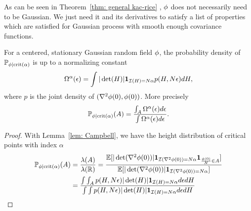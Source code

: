 \begin{remark}
	As can be seen in Theorem~\ref{thm: general kac-rice} \parencite[Theorem
	11.2.1]{adlerRandomFieldsGeometry2007}, \(\phi\) does not necessarily
	need to be Gaussian. We just need it and its derivatives to satisfy a
	list of properties which are satisfied for Gaussian process with
	smooth enough covariance functions.
\end{remark}

\begin{corollary}
	For a centered, stationary Gaussian random field \(\phi\), the probability
	density of \(\mathbb{P}_{\phi\mid\text{crit}(\alpha)}\) is up to a normalizing
	constant
	\begin{equation*}
		\Omega^\alpha(\epsilon)
		= \int |\det(H)| \mathbf{1}_{\mathcal{I}(H) = N\alpha} p(H, N\epsilon)dH,
	\end{equation*}
	where \(p\) is the joint density of \((\nabla^2 \phi(0), \phi(0))\).
	More precisely
	\[
		\mathbb{P}_{\phi\mid\text{crit}(\alpha)}(A)
		= \frac{\int_A \Omega^\alpha(\epsilon)d\epsilon}{\int \Omega^\alpha(\epsilon)d\epsilon}.
	\]
\end{corollary}
\begin{proof}
	With Lemma~\ref{lem: Campbell}, we have the height distribution of critical
	points with index \(\alpha\)
	\begin{align*}
		\mathbb{P}_{\phi\mid \text{crit}(\alpha)}(A)
		&= \frac{\lambda(A)}{\lambda(\mathbb{R})}
		= \frac{
			\mathbb{E}[|\det(\nabla^2 \phi(0))|
			\mathbf{1}_{\mathcal{I}(\nabla^2\phi(0))=N\alpha}
			\mathbf{1}_{\frac{\phi(0)}{N} \in A}
			]
		}{
			\mathbb{E}[|\det(\nabla^2 \phi(0))|\mathbf{1}_{\mathcal{I}(\nabla^2\phi(0))=N\alpha}]
		}\\
		&= \frac{
			\int \int_A p(H, N \epsilon) |\det(H)|
			\mathbf{1}_{\mathcal{I}(H)=N\alpha}d\epsilon dH
		}{
			\int \int p(H, N \epsilon) |\det(H)|
			\mathbf{1}_{\mathcal{I}(H)=N\alpha}d\epsilon dH
		}
		\qedhere
	\end{align*}
\end{proof}